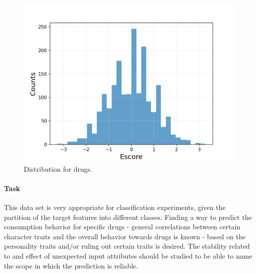 \documentclass{article}
\begin{document}
\begin{figure}[h!]
\begin{minipage}[b]{0.32\textwidth}
	\end{minipage}
	\begin{minipage}[b]{0.32\textwidth}
		\includegraphics[width=\textwidth]{plots/drugsPlots/Escore.png}
	\end{minipage}
	\caption{Distribution for drugs.}
	\label{drugs3}
\end{figure}


\clearpage
\paragraph{Task}

This data set is very appropriate for classification experiments, given the partition of the target features into different classes. Finding a way to predict the consumption behavior for specific drugs - general correlations between certain character traits and the overall behavior towards drugs is known\cite{Roncero2014NeuroticismAW}\cite{Vollrath2002WhoTH}\cite{Flory2002TheRA} - based on the personality traits and/or ruling out certain traits is desired. The stability related to and effect of unexpected input attributes should be studied to be able to name the scope in which the prediction is reliable.


\clearpage
{}

\end{document}
